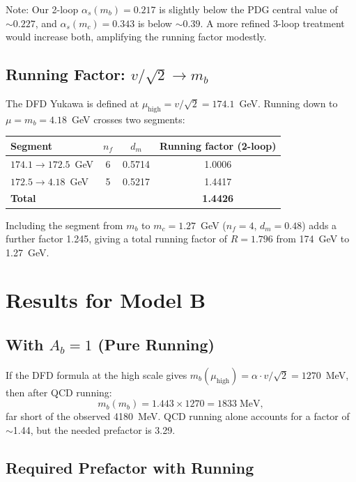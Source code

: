 \documentclass[11pt]{article}
\begin{document}
Note: Our 2-loop $\alpha_s(m_b) = 0.217$ is slightly below the PDG
central value of $\sim 0.227$, and $\alpha_s(m_c) = 0.343$ is below
$\sim 0.39$.  A more refined 3-loop treatment would increase both,
amplifying the running factor modestly.

\subsection{Running Factor: $v/\sqrt{2} \to m_b$}

The DFD Yukawa is defined at $\mu_{\text{high}} = v/\sqrt{2} = 174.1$~GeV.
Running down to $\mu = m_b = 4.18$~GeV crosses two segments:

\begin{center}
\begin{tabular}{lccc}
\toprule
Segment & $n_f$ & $d_m$ & Running factor (2-loop) \\
\midrule
$174.1 \to 172.5$~GeV & 6 & 0.5714 & 1.0006 \\
$172.5 \to 4.18$~GeV  & 5 & 0.5217 & 1.4417 \\
\midrule
\textbf{Total} & & & \textbf{1.4426} \\
\bottomrule
\end{tabular}
\end{center}

Including the segment from $m_b$ to $m_c = 1.27$~GeV ($n_f = 4$,
$d_m = 0.48$) adds a further factor 1.245, giving a total running
factor of $R = 1.796$ from 174~GeV to 1.27~GeV.

\section{Results for Model B}

\subsection{With $A_b = 1$ (Pure Running)}

If the DFD formula at the high scale gives
$m_b(\mu_{\text{high}}) = \alpha \cdot v/\sqrt{2} = 1270$~MeV,
then after QCD running:
\begin{equation}
  m_b(m_b) = 1.443 \times 1270 = 1833 \;\text{MeV},
\end{equation}
far short of the observed 4180~MeV.  QCD running alone accounts for
a factor of $\sim$1.44, but the needed prefactor is 3.29.

\subsection{Required Prefactor with Running}
\end{document}
